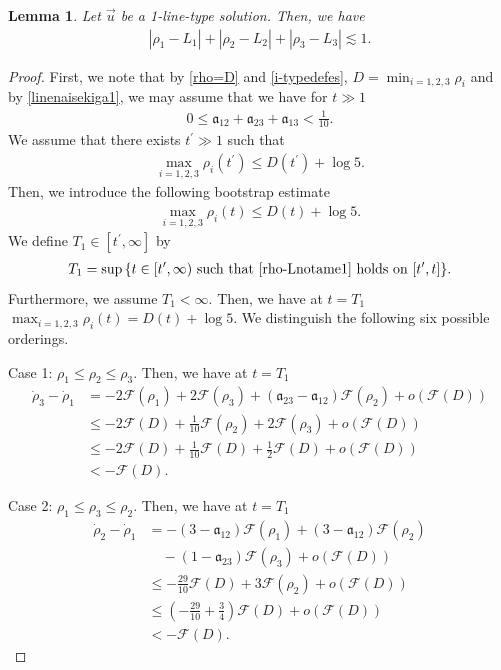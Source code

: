 \documentclass[reqno]{amsart}
\theoremstyle{plain}
\newtheorem{lemma}[theorem]{Lemma}
\theoremstyle{definition}
\numberwithin{equation}{section}
\begin{document}
\begin{lemma}\label{rhoi-Liyuukailem}
Let $\vec{u}$ be a 1-line-type solution. Then, we have
\begin{align}\label{rhii-Liyuukai}
\left|\rho_1-L_1\right|+\left|\rho_2-L_2\right|+\left|\rho_3-L_3\right|\lesssim 1.
\end{align}
\end{lemma}
\begin{proof}
First, we note that by \eqref{rho=D} and \eqref{i-typedefes}, $D=\min_{i=1,2,3}\rho_i$ and by \eqref{linenaisekiga1}, we may assume that we have for $t\gg 1$
\begin{align*}
0\leq \mathfrak{a}_{12}+\mathfrak{a}_{23}+\mathfrak{a}_{13}<\frac{1}{10}.
\end{align*}
We assume that there exists $t^{\prime}\gg 1$ such that 
\begin{align*}
\max_{i=1,2,3}\rho_i(t^{\prime})\leq D(t^{\prime})+\log{5}.
\end{align*}
Then, we introduce the following bootstrap estimate
\begin{align}\label{rho-Lnotame1}
\max_{i=1,2,3}\rho_i(t)\leq D(t)+\log{5}.
\end{align}
We define $T_1\in [t^{\prime},\infty]$ by
\begin{align}\label{rho-Lyuukaibs}
T_1=\sup{\{t\in[t^{\prime},\infty)\ \mbox{such that}\ \eqref{rho-Lnotame1}\ \mbox{holds on}\ [t^{\prime},t] \}}.
\end{align}
Furthermore, we assume $T_1<\infty$. Then, we have at $t=T_1$ $\max_{i=1,2,3}\rho_i(t)=D(t)+\log{5}$. We distinguish the following six possible orderings.

Case 1: $\rho_1\leq \rho_2\leq \rho_3$. Then, we have at $t=T_1$
\begin{align*}
\dot{\rho}_3-\dot{\rho}_1&=-2\mathcal{F}(\rho_1)+2\mathcal{F}(\rho_3)+\left(\mathfrak{a}_{23}-\mathfrak{a}_{12}\right)\mathcal{F}(\rho_2)+o\left(\mathcal{F}(D)\right)
\\
&\leq -2\mathcal{F}(D)+\frac{1}{10}\mathcal{F}(\rho_2)+2\mathcal{F}(\rho_3)+o\left(\mathcal{F}(D)\right)
\\
&\leq  -2\mathcal{F}(D)+\frac{1}{10}\mathcal{F}(D)+\frac{1}{2}\mathcal{F}(D)+o\left(\mathcal{F}(D)\right)
\\
&<-\mathcal{F}(D).
\end{align*}

Case 2: $\rho_1\leq \rho_3\leq \rho_2$. Then, we have at $t=T_1$
\begin{align*}
\dot{\rho}_2-\dot{\rho}_1&=-\left(3-\mathfrak{a}_{12}\right)\mathcal{F}(\rho_1)+\left(3-\mathfrak{a}_{12}\right)\mathcal{F}(\rho_2)
\\
&\quad -\left(1-\mathfrak{a}_{23}\right)\mathcal{F}(\rho_3)+o\left(\mathcal{F}(D)\right)
\\
&\leq -\frac{29}{10}\mathcal{F}(D)+3\mathcal{F}(\rho_2)+o\left(\mathcal{F}(D)\right)
\\
&\leq\left(-\frac{29}{10}+\frac{3}{4}\right)\mathcal{F}(D)+o\left(\mathcal{F}(D)\right)
\\
&<-\mathcal{F}(D).
\end{align*}


\end{proof}
\end{document}
